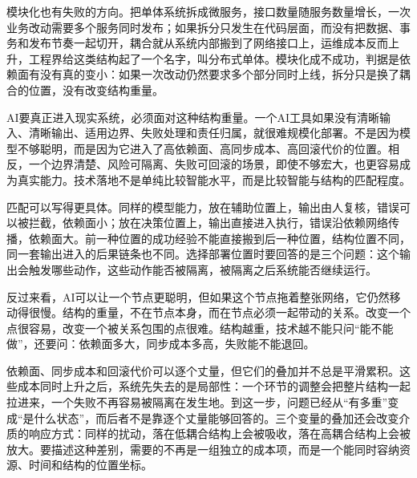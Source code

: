 模块化也有失败的方向。把单体系统拆成微服务，接口数量随服务数量增长，一次业务改动需要多个服务同时发布；如果拆分只发生在代码层面，而没有把数据、事务和发布节奏一起切开，耦合就从系统内部搬到了网络接口上，运维成本反而上升，工程界给这类结构起了一个名字，叫分布式单体\cite{taibi2018architectural}。模块化成不成功，判据是依赖面有没有真的变小：如果一次改动仍然要求多个部分同时上线，拆分只是换了耦合的位置，没有改变结构重量。


AI要真正进入现实系统，必须面对这种结构重量。一个AI工具如果没有清晰输入、清晰输出、适用边界、失败处理和责任归属，就很难规模化部署。不是因为模型不够聪明，而是因为它进入了高依赖面、高同步成本、高回滚代价的位置。相反，一个边界清楚、风险可隔离、失败可回滚的场景，即使不够宏大，也更容易成为真实能力。技术落地不是单纯比较智能水平，而是比较智能与结构的匹配程度。

匹配可以写得更具体。同样的模型能力，放在辅助位置上，输出由人复核，错误可以被拦截，依赖面小；放在决策位置上，输出直接进入执行，错误沿依赖网络传播，依赖面大。前一种位置的成功经验不能直接搬到后一种位置，结构位置不同，同一套输出进入的后果链条也不同。选择部署位置时要回答的是三个问题：这个输出会触发哪些动作，这些动作能否被隔离，被隔离之后系统能否继续运行。

反过来看，AI可以让一个节点更聪明，但如果这个节点拖着整张网络，它仍然移动得很慢。结构的重量，不在节点本身，而在节点必须一起带动的关系。改变一个点很容易，改变一个被关系包围的点很难。结构越重，技术越不能只问“能不能做”，还要问：依赖面多大，同步成本多高，失败能不能退回。

依赖面、同步成本和回滚代价可以逐个丈量，但它们的叠加并不总是平滑累积。这些成本同时上升之后，系统先失去的是局部性：一个环节的调整会把整片结构一起拉进来，一个失败不再容易被隔离在发生地。到这一步，问题已经从“有多重”变成“是什么状态”，而后者不是靠逐个丈量能够回答的。三个变量的叠加还会改变介质的响应方式：同样的扰动，落在低耦合结构上会被吸收，落在高耦合结构上会被放大。要描述这种差别，需要的不再是一组独立的成本项，而是一个能同时容纳资源、时间和结构的位置坐标。
